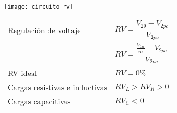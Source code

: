 \documentclass[11pt,a4paper]{article}
\begin{document}
		\begin{cajita}
		
		
		\begin{multicols}{2}
			\texttt{[image: circuito-rv]} \\
			
			\begin{tabular}{l l}
				Regulación de voltaje & $RV=\dfrac{V_{20}-V_{2pc}}{V_{2pc}}$\\[.3cm]
				& $RV = \dfrac{\frac{V_{1n}}{m} - V_{2pc}}{V_{2pc}}$\\[.3cm]
				RV ideal & $RV = 0 \%$ \\[.1cm]
				Cargas resistivas e inductivas & $RV_L > RV_R > 0$ \\[.1cm]
				Cargas capacitivas & $RV_C < 0$ \\
			\end{tabular}\\
		\end{multicols}
		
		\end{cajita}
		
\end{document}
